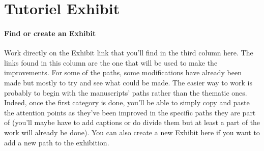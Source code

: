 	\chapter{\label{Tutoriel}Tutoriel Exhibit}
	\subsubsection{Find or create an Exhibit}
    Work directly on the Exhibit link that you’ll find in the third column here. The links found in this column are the one that will be used to make the improvements. For some of the paths, some modifications have already been made but mostly to try and see what could be made. The easier way to work is probably to begin with the manuscripts' paths rather than the thematic ones. Indeed, once the first category is done, you’ll be able to simply copy and paste the attention points as they’ve been improved in the specific paths they are part of (you’ll maybe have to add captions or do divide them but at least a part of the work will already be done). 
    You can also create a new Exhibit here if you want to add a new path to the exhibition. 

